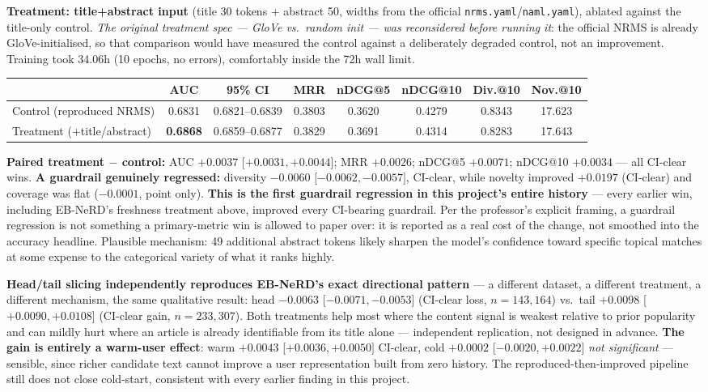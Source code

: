 \documentclass[11pt]{article}
\begin{document}
\textbf{Treatment: title+abstract input} (title 30 tokens + abstract 50, widths
from the official \texttt{nrms.yaml}/\texttt{naml.yaml}), ablated against the
title-only control. \emph{The original treatment spec --- GloVe vs.\ random
init --- was reconsidered before running it}: the official NRMS is already
GloVe-initialised, so that comparison would have measured the control against a
deliberately degraded control, not an improvement. Training took 34.06h (10
epochs, no errors), comfortably inside the 72h wall limit.

\begin{center}
{\footnotesize
\begin{tabular}{@{}lccccccc@{}}
\toprule
& AUC & 95\% CI & MRR & nDCG@5 & nDCG@10 & Div.@10 & Nov.@10 \\
\midrule
Control (reproduced NRMS) & 0.6831 & 0.6821--0.6839 & 0.3803 & 0.3620 & 0.4279 & 0.8343 & 17.623 \\
Treatment (+title\slash abstract) & \textbf{0.6868} & 0.6859--0.6877 & 0.3829 & 0.3691 & 0.4314 & 0.8283 & 17.643 \\
\bottomrule
\end{tabular}\par}
\end{center}

\textbf{Paired treatment $-$ control:} AUC $+0.0037$ [$+0.0031,+0.0044$]; MRR
$+0.0026$; nDCG@5 $+0.0071$; nDCG@10 $+0.0034$ --- all CI-clear wins.
\textbf{A guardrail genuinely regressed:} diversity $-0.0060$
[$-0.0062,-0.0057]$, CI-clear, while novelty improved $+0.0197$ (CI-clear) and
coverage was flat ($-0.0001$, point only). \textbf{This is the first guardrail
regression in this project's entire history} --- every earlier win, including
EB-NeRD's freshness treatment above, improved every CI-bearing guardrail. Per
the professor's explicit framing, a guardrail regression is not something a
primary-metric win is allowed to paper over: it is reported as a real cost of
the change, not smoothed into the accuracy headline. Plausible mechanism:
49 additional abstract tokens likely sharpen the model's confidence toward
specific topical matches at some expense to the categorical variety of what it
ranks highly.

\textbf{Head/tail slicing independently reproduces EB-NeRD's exact directional
pattern} --- a different dataset, a different treatment, a different mechanism,
the same qualitative result: head $-0.0063$ [$-0.0071,-0.0053$] (CI-clear loss,
$n=143{,}164$) vs.\ tail $+0.0098$ [$+0.0090,+0.0108$] (CI-clear gain,
$n=233{,}307$). Both treatments help most where the content signal is weakest
relative to prior popularity and can mildly hurt where an article is already
identifiable from its title alone --- independent replication, not designed in
advance. \textbf{The gain is entirely a warm-user effect}: warm $+0.0043$
[$+0.0036,+0.0050]$ CI-clear, cold $+0.0002$ [$-0.0020,+0.0022]$ \emph{not
significant} --- sensible, since richer candidate text cannot improve a user
representation built from zero history. The reproduced-then-improved pipeline
still does not close cold-start, consistent with every earlier finding in this
project.
\end{document}
